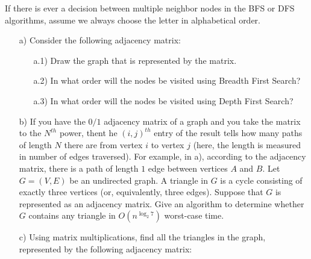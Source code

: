 \documentclass{article}
\begin{document}
\begin{problem}

If there is ever a decision between multiple neighbor nodes in the BFS or DFS algorithms, assume we always choose the letter in alphabetical order.


\begin{itemize}
	\item[a)]{} Consider the following adjacency matrix:
		\begin{figure}[h!]
			\centering
		\end{figure}
		
		\begin{itemize}
			\item[a.1)]{} Draw the graph that is represented by the matrix.
			\item[a.2)]{} In what order will the nodes be visited using Breadth First Search?
			\item[a.3)]{} In what order will the nodes be visited using Depth First Search?
		\end{itemize}
	\item[b)]{} If you have the $0/1$ adjacency matrix of a graph and you take the matrix to the $N^{th}$ power, thent he $(i,j)^{th}$ entry of the result tells how many paths of length $N$ there are from vertex $i$ to vertex $j$ (here, the length is measured in number of edges traversed).  For example, in a), according to the adjacency matrix, there is a path of length $1$ edge between vertices $A$ and $B$.
		\vskip 0.15in
		Let $G = (V,E)$ be an undirected graph.  A triangle in $G$ is a cycle consisting of exactly three vertices (or, equivalently, three edges).  Suppose that $G$ is represented as an adjacency matrix.  Give an algorithm to determine whether $G$ contains any triangle in $O(n^{\log_2{7}})$ worst-case time.
	\item[c)]{} Using matrix multiplications, find all the triangles in the graph, represented by the following adjacency matrix:
		\begin{figure}[h!]
			\centering
		\end{figure}
\end{itemize}
\end{problem}
\end{document}
